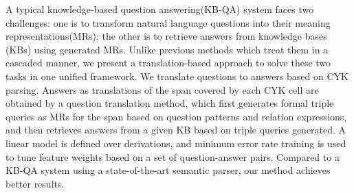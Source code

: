 A typical knowledge-based question answering(KB-QA) system faces two challenges: one is to transform natural language questions into their meaning representations(MRs); the other is to retrieve answers from knowledge bases (KBs) using generated MRs. Unlike previous methods which treat them in a cascaded manner, we present a translation-based approach to solve these two tasks in one unified framework. We translate questions to answers based on CYK parsing. Answers as translations of the span covered by each CYK cell are obtained by a question translation method, which first generates formal triple queries as MRs for the span based on question patterns and relation expressions, and then retrieves answers from a given KB based on triple queries generated. A linear model is defined over derivations, and minimum error rate training is used to tune feature weights based on a set of question-answer pairs. Compared to a KB-QA system using a state-of-the-art semantic parser, our method achieves better results.
